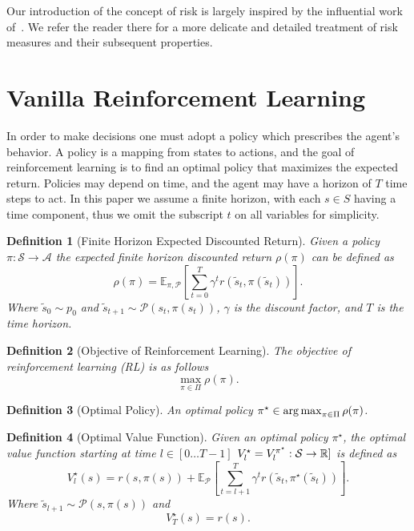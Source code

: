 \documentclass[10pt]{article}
\newtheorem{definition}{Definition}
\renewcommand{\cite}{\citep}
\theoremstyle{plain}
\theoremstyle{remark}
\begin{document}
Our introduction of the concept of risk is largely inspired by the influential work of~\cite{follmer2016}. We refer the reader there for a more delicate and detailed treatment of risk measures and their subsequent properties.

\section{Vanilla Reinforcement Learning}

In order to make decisions one must adopt a policy which prescribes the agent's behavior.
A policy is a mapping from states to actions, and the goal of reinforcement learning is to find an optimal policy that maximizes the expected return.
Policies may depend on time, and the agent may have a horizon of $T$ time steps to act. 
In this paper we assume a finite horizon, with each $s \in S$ having a time component, thus we omit the subscript $t$ on all variables for simplicity.

\begin{definition}[Finite Horizon Expected Discounted Return]
        Given a policy $\pi : \mathcal{S} \to \mathcal{A}$ the expected finite horizon discounted return $\rho(\pi)$ can be defined as
        \[ 
          \rho(\pi) = \mathbb{E}_{\pi, \mathcal{P}} \left[ \sum_{t=0}^{T} \gamma^t r(\tilde{s}_t, \pi(\tilde{s}_t)) \right].
        \]
        Where $\tilde{s}_0 \sim p_0$ and $\tilde{s}_{t+1} \sim \mathcal{P}(s_t, \pi(s_t))$, $\gamma$ is the discount factor, and $T$ is the time horizon.
\end{definition}

\begin{definition}[Objective of Reinforcement Learning]\label{def:rl_obj}
        The objective of reinforcement learning (RL) is as follows
        \[
        \max_{\pi \in \Pi} \rho(\pi). 
        \]
\end{definition}

\begin{definition}[Optimal Policy]\label{def:optimal_policy}
        An optimal policy $\pi^\star \in \operatorname*{arg\,max}_{\pi \in \Pi} \rho(\pi)$.
\end{definition}

\begin{definition}[Optimal Value Function]\label{def:optimal_value_function}
        Given an optimal policy $\pi^\star$, the optimal value function starting at time $l \in [0\ldots T-1]$ $V^\star_l = V^{\pi^\star}_l : \mathcal{S} \to \mathbb{R}]$ is defined as
        \[
          V^\star_l(s) = r(s,\pi(s)) + \mathbb{E}_{\mathcal{P}} \left[ \sum_{t=l+1}^{T} \gamma^t r(\tilde{s}_t, \pi^\star(\tilde{s}_t)) \right].
        \]
        Where $\tilde{s}_{l+1} \sim \mathcal{P}(s, \pi(s))$ and
        \[
          V^\star_T(s) = r(s).
        \]
\end{definition}
\end{document}
